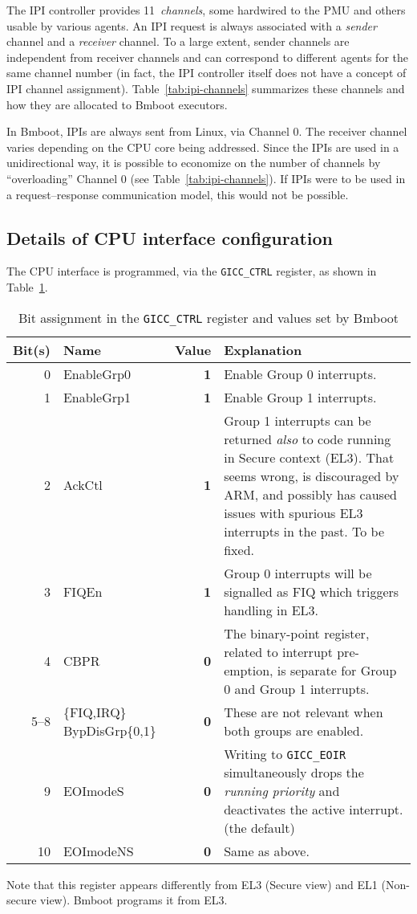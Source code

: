 The IPI controller provides 11~\textit{channels}, some hardwired to the PMU and others usable by various agents. An IPI request is always associated with a \textit{sender} channel and a \textit{receiver} channel. To a large extent, sender channels are independent from receiver channels and can correspond to different agents for the same channel number (in fact, the IPI controller itself does not have a concept of IPI channel assignment). Table~\ref{tab:ipi-channels} summarizes these channels and how they are allocated to Bmboot executors.

In Bmboot, IPIs are always sent from Linux, via Channel 0. The receiver channel varies depending on the CPU core being addressed. Since the IPIs are used in a unidirectional way, it is possible to economize on the number of channels by ``overloading'' Channel 0 (see Table~\ref{tab:ipi-channels}). If IPIs were to be used in a request--response communication model, this would not be possible.

\subsection{Details of CPU interface configuration}

The CPU interface is programmed, via the \texttt{GICC\_CTRL} register, as shown in Table~\ref{tab:gicc-ctrl}.

\begin{table}[hb]
	\centering
	\begin{tabular}{rp{3.0cm}rp{8cm}}\toprule
		\textbf{Bit(s)} & \textbf{Name} & \textbf{Value} & \textbf{Explanation}\\\midrule
		0 & EnableGrp0 & \textbf{1} & Enable Group 0 interrupts. \\
		1 & EnableGrp1 & \textbf{1} & Enable Group 1 interrupts. \\
		2 & AckCtl & \textbf{1} & Group 1 interrupts can be returned \textit{also} to code running in Secure context (EL3). That seems wrong, is discouraged by ARM, and possibly has caused issues with spurious EL3 interrupts in the past. To be fixed. \\
		3 & FIQEn & \textbf{1} & Group 0 interrupts will be signalled as FIQ which triggers handling in EL3. \\
		4 & CBPR & \textbf{0} & The binary-point register, related to interrupt pre-emption, is separate for Group 0 and Group 1 interrupts. \\
		5--8 & \{FIQ,IRQ\} BypDisGrp\{0,1\} & \textbf{0} & These are not relevant when both groups are enabled. \\
		9 & EOImodeS & \textbf{0} & Writing to \texttt{GICC\_EOIR} simultaneously drops the \textit{running priority} and deactivates the active interrupt. (the default) \\
		10 & EOImodeNS & \textbf{0} & Same as above. \\\bottomrule
	\end{tabular}
	
	\caption{Bit assignment in the \texttt{GICC\_CTRL} register and values set by Bmboot}
	\label{tab:gicc-ctrl}
\end{table}

Note that this register appears differently from EL3 (Secure view) and EL1 (Non-secure view). Bmboot programs it from EL3.
